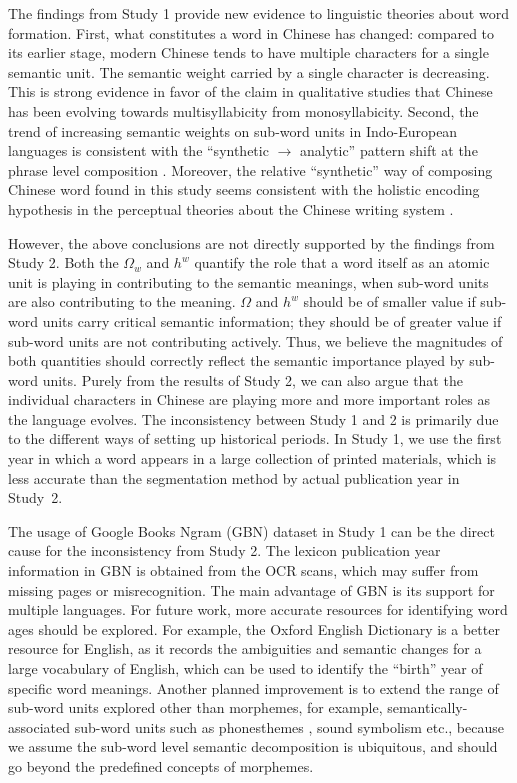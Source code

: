 \documentclass[output=paper]{langsci/langscibook}
\begin{document}
The findings from Study 1 provide new evidence to linguistic theories about word formation. 
First, what constitutes a word in Chinese has changed: compared to its earlier stage, modern Chinese tends to have multiple characters for a single semantic unit. The semantic weight carried by a single character is decreasing. This is strong evidence in favor of the claim in qualitative studies that Chinese has been evolving towards multisyllabicity from monosyllabicity. 
Second, the trend of increasing semantic weights on sub-word units in Indo-European languages is consistent with the ``synthetic $\rightarrow$ analytic'' pattern shift at the phrase level composition \citep{hamilton-etal-2016-diachronic}. 
Moreover, the relative ``synthetic'' way of composing Chinese word found in this study seems consistent with the holistic encoding hypothesis in the perceptual theories about the Chinese writing system \citep{dehaene2005neural,mo2015holistic}. 

However, the above conclusions are not directly supported by the findings from Study 2. 
Both the $\Omega_w$ and $h^w$ quantify the role that a word itself as an atomic unit is playing in contributing to the semantic meanings, when sub-word units are also contributing to the meaning. $\Omega$ and $h^w$ should be of smaller value if sub-word units carry critical semantic information; they should be of greater value if sub-word units are not contributing actively. 
Thus, we believe the magnitudes of both quantities should correctly reflect the semantic importance played by sub-word units. 
Purely from the results of Study 2, we can also argue that the individual characters in Chinese are playing more and more important roles as the language evolves.
The inconsistency between Study 1 and 2 is primarily due to the different ways of setting up historical periods. In Study 1, we use the first year in which a word appears in a large collection of printed materials, which is less accurate than the segmentation method by actual publication year in Study~2. 

The usage of Google Books Ngram (GBN) dataset in Study 1 can be the direct cause for the inconsistency from Study 2. The lexicon publication year information in GBN is obtained from the OCR scans, which may suffer from missing pages or misrecognition. The main advantage of GBN is its support for multiple languages. For future work, more accurate resources for identifying word ages should be explored. For example, the Oxford English Dictionary \citep{oed} is a better resource for English, as it records the ambiguities and semantic changes for a large vocabulary of English, which can be used to identify the ``birth'' year of specific word meanings. 
Another planned improvement is to extend the range of sub-word units explored other than morphemes, for example, semantically-associated sub-word units such as phonesthemes \citep{bergen2004psychological,sagi2019taming}, sound symbolism \citep{imai2008sound} etc., because we assume the sub-word level semantic decomposition is ubiquitous, and should go beyond the predefined concepts of morphemes. 
\end{document}
